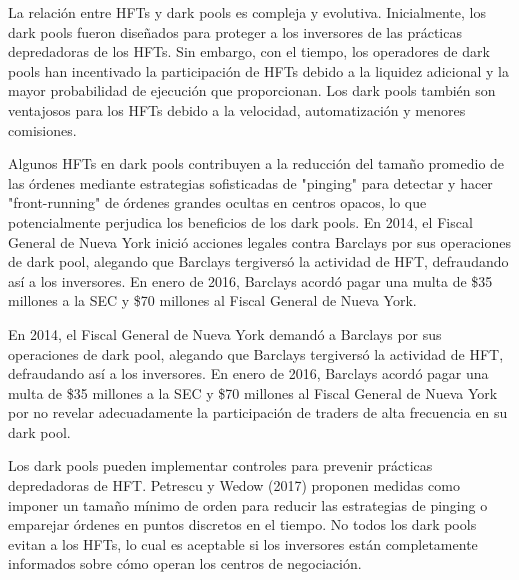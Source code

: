 \begin{proposicion}
La relación entre HFTs y dark pools es compleja y evolutiva. Inicialmente, los dark pools fueron diseñados para proteger a los inversores de las prácticas depredadoras de los HFTs. Sin embargo, con el tiempo, los operadores de dark pools han incentivado la participación de HFTs debido a la liquidez adicional y la mayor probabilidad de ejecución que proporcionan. Los dark pools también son ventajosos para los HFTs debido a la velocidad, automatización y menores comisiones.
\end{proposicion}

\begin{proposicion}
Algunos HFTs en dark pools contribuyen a la reducción del tamaño promedio de las órdenes mediante estrategias sofisticadas de "pinging" para detectar y hacer "front-running" de órdenes grandes ocultas en centros opacos, lo que potencialmente perjudica los beneficios de los dark pools. En 2014, el Fiscal General de Nueva York inició acciones legales contra Barclays por sus operaciones de dark pool, alegando que Barclays tergiversó la actividad de HFT, defraudando así a los inversores. En enero de 2016, Barclays acordó pagar una multa de \$35 millones a la SEC y \$70 millones al Fiscal General de Nueva York.
\end{proposicion}

\begin{ejemplo}
En 2014, el Fiscal General de Nueva York demandó a Barclays por sus operaciones de dark pool, alegando que Barclays tergiversó la actividad de HFT, defraudando así a los inversores. En enero de 2016, Barclays acordó pagar una multa de \$35 millones a la SEC y \$70 millones al Fiscal General de Nueva York por no revelar adecuadamente la participación de traders de alta frecuencia en su dark pool.
\end{ejemplo}

\begin{proposicion}
Los dark pools pueden implementar controles para prevenir prácticas depredadoras de HFT. Petrescu y Wedow (2017) proponen medidas como imponer un tamaño mínimo de orden para reducir las estrategias de pinging o emparejar órdenes en puntos discretos en el tiempo. No todos los dark pools evitan a los HFTs, lo cual es aceptable si los inversores están completamente informados sobre cómo operan los centros de negociación.
\end{proposicion}

